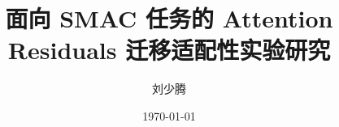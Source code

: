 \documentclass[UTF8,a4paper,12pt]{ctexart}
\title{面向 SMAC 任务的 Attention Residuals 迁移适配性实验研究}
\author{刘少腾}
\date{\today}
\begin{document}
\maketitle

\begin{abstract}

\end{abstract}

\tableofcontents
\newpage


\newpage













\appendix

\end{document}
